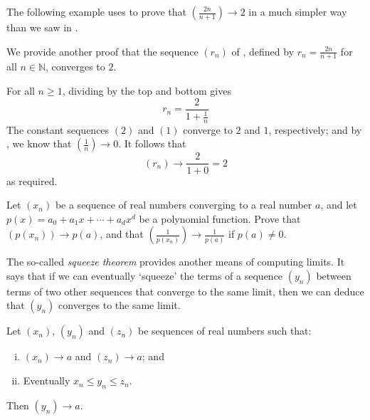 The following example uses  to prove that $\left( \frac{2n}{n+1} \right) \to 2$ in a much simpler way than we saw in .

\begin{example}
\label{exTwoNOverNPlusOneConvergenceAgain}
We provide another proof that the sequence $(r_n)$ of , defined by $r_n=\frac{2n}{n+1}$ for all $n \in \mathbb{N}$, converges to $2$.

For all $n \ge 1$, dividing by the top and bottom gives
\[ r_n=\frac{2}{1+\frac{1}{n}} \]
The constant sequences $(2)$ and $(1)$ converge to $2$ and $1$, respectively; and by , we know that $(\frac{1}{n}) \to 0$. It follows that
\[ (r_n) \to \frac{2}{1+0} = 2 \]
as required.
\end{example}

\begin{exercise}
\label{exPolynomialsAreContinuousUsingSequences}
Let $(x_n)$ be a sequence of real numbers converging to a real number $a$, and let $p(x) = a_0 + a_1x + \cdots + a_d x^d$ be a polynomial function. Prove that $(p(x_n)) \to p(a)$, and that $\left( \frac{1}{p(x_n)} \right) \to \frac{1}{p(a)}$ if $p(a) \ne 0$.
\end{exercise}

The so-called \textit{squeeze theorem} provides another means of computing limits. It says that if we can eventually `squeeze' the terms of a sequence $(y_n)$ between terms of two other sequences that converge to the same limit, then we can deduce that $(y_n)$ converges to the same limit.

\begin{theorem}
\label{thmSqueeze}
Let $(x_n)$, $(y_n)$ and $(z_n)$ be sequences of real numbers such that:
\begin{enumerate}[(i)]
\item $(x_n) \to a$ and $(z_n) \to a$; and
\item Eventually $x_n \le y_n \le z_n$.
\end{enumerate}
Then $(y_n) \to a$.
\end{theorem}

